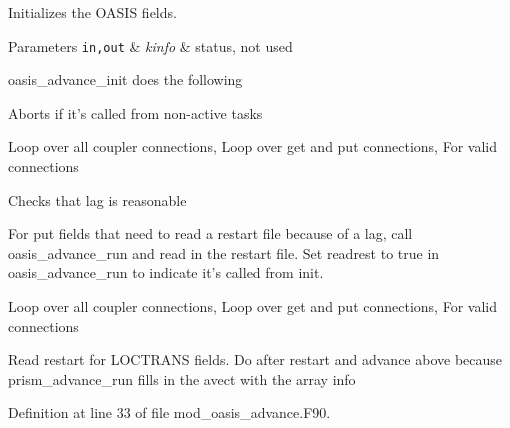Initializes the O\+A\+S\+I\+S fields. 


\begin{DoxyParams}[1]{Parameters}
\mbox{\tt in,out}  & {\em kinfo} & status, not used \\
\hline
\end{DoxyParams}
oasis\+\_\+advance\+\_\+init does the following
\begin{DoxyItemize}
\item Aborts if it's called from non-\/active tasks
\item Loop over all coupler connections, Loop over get and put connections, For valid connections
\begin{DoxyItemize}
\item Checks that lag is reasonable
\item For put fields that need to read a restart file because of a lag, call oasis\+\_\+advance\+\_\+run and read in the restart file. Set readrest to true in oasis\+\_\+advance\+\_\+run to indicate it's called from init.
\end{DoxyItemize}
\item Loop over all coupler connections, Loop over get and put connections, For valid connections
\begin{DoxyItemize}
\item Read restart for L\+O\+C\+T\+R\+A\+N\+S fields. Do after restart and advance above because prism\+\_\+advance\+\_\+run fills in the avect with the array info 
\end{DoxyItemize}
\end{DoxyItemize}

Definition at line 33 of file mod\+\_\+oasis\+\_\+advance.\+F90.


